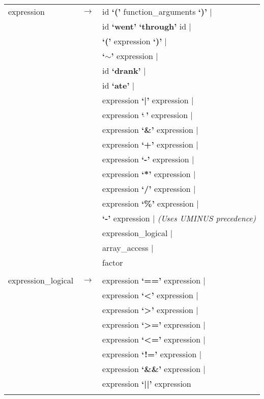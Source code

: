 \documentclass[landscape]{article}
\begin{document}
\begin{longtable}{ l c l}
    expression & \ensuremath{\to} &  id \textbf{`('} function\_arguments  \textbf{`)'}  | \\
    & &  id \textbf{`went'} \textbf{`through'} id | \\
    & &  \textbf{`('} expression  \textbf{`)'}  | \\
    & &  \textbf{`$\sim$'} expression   | \\
    & &  id \textbf{`drank'}  | \\
    & &  id \textbf{`ate'}  | \\
    & &  expression  \textbf{`|'} expression   | \\
    & &  expression  \textbf{`$\hat{\ }$'} expression   | \\
    & &  expression  \textbf{`\&'} expression   | \\
    & &  expression  \textbf{`+'} expression   | \\
    & &  expression  \textbf{`-'} expression   | \\
    & &  expression  \textbf{`*'} expression   | \\
    & &  expression  \textbf{`/'} expression   | \\
    & &  expression  \textbf{`\%'} expression |\\
    & &  \textbf{`-'} expression | \scriptsize{\textit{(Uses UMINUS precedence)}}\\
    & &  expression\_logical |   \\
    & &  array\_access | \\
    & &  factor    \\

    \\

    expression\_logical & \ensuremath{\to} &  expression  \textbf{`=='} expression   | \\
    & &  expression  \textbf{`<'} expression   | \\
    & &  expression  \textbf{`>'} expression   | \\
    & &  expression  \textbf{`>='} expression   | \\
    & &  expression  \textbf{`<='} expression   | \\
    & &  expression  \textbf{`!='} expression   | \\
    & &  expression  \textbf{`\&\&'} expression   | \\
    & &  expression  \textbf{`||'} expression    \\

    \\


\end{longtable}
\end{document}

